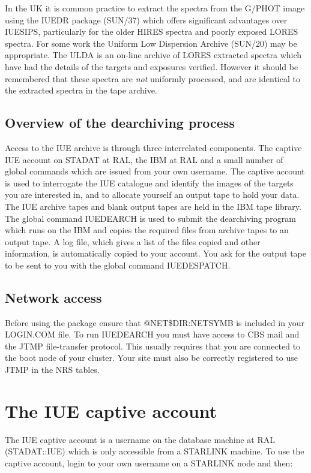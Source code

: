 In the UK it is common practice to extract the spectra from the G/PHOT
image using the IUEDR package (SUN/37)
which offers significant advantages over IUESIPS,
particularly for the older HIRES spectra and poorly exposed LORES spectra.
For some work the Uniform Low Dispersion Archive (SUN/20) may be appropriate.
The ULDA is an on-line archive of LORES extracted spectra which have had the 
details
of the targets and exposures verified. However it should be remembered that 
these spectra are {\it not} uniformly processed, and are identical to the 
extracted spectra in the tape archive.

\subsection {Overview of the dearchiving process}

Access to the IUE archive is through three interrelated components.
The captive IUE account on STADAT at RAL, the IBM at RAL and
a small number of global commands which are issued from your own username.
The captive account
is used to interrogate the IUE catalogue and identify the images
of the targets you are interested in, 
and to allocate yourself an output tape to hold your data.
The IUE archive tapes and blank output tapes are held in the IBM tape library.
The global command IUEDEARCH is used to submit the
dearchiving program which runs on the IBM
and copies the required files from archive tapes to an output tape.
A log file, which gives a list of the files copied and other information,
is automatically copied to your account.
You ask for the output tape to be sent to you with the global command
IUEDESPATCH.

\subsection {Network access}

Before using the package ensure that @NET\$DIR:NETSYMB is included in your 
LOGIN.COM file.
To run IUEDEARCH you must have access to CBS mail and the JTMP
file-transfer protocol. This usually requires that you are
connected to the boot node of your cluster.
Your site must also be correctly registered to use JTMP in the NRS tables.

\section {The IUE captive account}

The IUE captive account is a username on the database machine at RAL 
(STADAT::IUE) which is only accessible from a STARLINK machine.
To use the captive account, login to your own username on a STARLINK node
and then:

